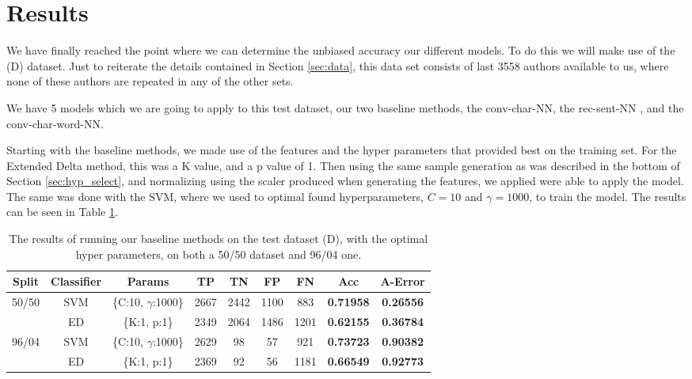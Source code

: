 \section{Results} \label{sec:results}

We have finally reached the point where we can determine the unbiased accuracy
our different models. To do this we will make use of the (D) dataset. Just
to reiterate the details contained in Section \ref{sec:data}, this data set
consists of last 3558 authors available to us, where none of these authors are
repeated in any of the other sets.

We have 5 models which we are going to apply to this test dataset, our
two baseline methods, the \gls{conv-char-NN}, the \gls{rec-sent-NN} , and the
\gls{conv-char-word-NN}.

Starting with the baseline methods, we made use of the features and the
hyper parameters that provided best on the training set.
For the Extended Delta method, this was a K value, and a p value of 1.
Then using the same sample generation as was described in the bottom
of Section \ref{sec:hyp_select}, and normalizing using the scaler
produced when generating the features, we applied were able to apply the model.
The same was done with the SVM, where we used to optimal found hyperparameters,
$C=10$ and $\gamma = 1000$, to train the model. The results can be seen in Table
\ref{tab:baseline-res}.

\begin{table}[h]
\centering
\begin{tabular}{|c|c|c|c|c|c|c||c|c|}
\hline
Split & Classifier & Params & TP & TN & FP & FN & \textbf{Acc} & \textbf{A-Error} \\ \hline
\multirow{2}{*}{50/50} & SVM & \{C:10, $\gamma$:1000\} & 2667 & 2442 & 1100 & 883 & \textbf{0.71958} & \textbf{0.26556} \\ \cline{2-9} 
 & ED & \{K:1, p:1\} & 2349 & 2064 & 1486 & 1201 & \textbf{0.62155} & \textbf{0.36784} \\ \hline
\multirow{2}{*}{96/04} & SVM & \{C:10, $\gamma$:1000\} & 2629 & 98 & 57 & 921 & \textbf{0.73723} & \textbf{0.90382} \\ \cline{2-9} 
 & ED & \{K:1, p:1\} & 2369 & 92 & 56 & 1181 & \textbf{0.66549} & \textbf{0.92773} \\ \hline \end{tabular}
\caption{The results of running our baseline methods on the test dataset (D), with the optimal hyper
parameters, on both a 50/50 dataset and 96/04 one.}
\label{tab:baseline-res}
\end{table}

